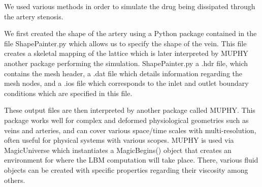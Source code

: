 We used various methods in order to simulate the drug being dissipated through the artery stenosis. 

We first created the shape of the artery using a Python package contained in the file ShapePainter.py which allows us to specify the shape of the vein. This file creates a skeletal mapping of the lattice which is later interpreted by MUPHY another package performing the simulation. ShapePainter.py a .hdr file, which contains the mesh header, a .dat file which details information regarding the mesh nodes, and a .ios file which corresponds to the inlet and outlet boundary conditions which are specified in this file. 

These output files are then interpreted by another package called MUPHY. This package works well for complex and deformed physiological geometries such as veins and arteries, and can cover various
space/time scales with multi-resolution, often useful for physical systems with various scopes. MUPHY is used via MagicUniverse which instantiates a MagicBegins() object that creates an environment for where the LBM computation will take place. There, various fluid objects can be created with specific properties regarding their viscosity among others. 